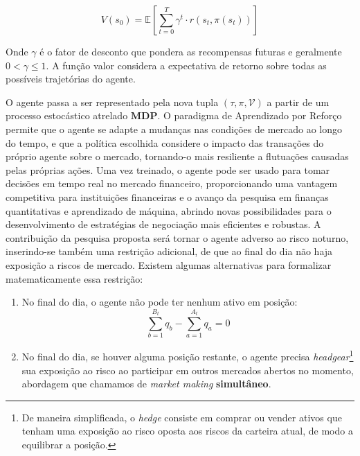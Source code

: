 \begin{itemize}
	\begin{equation*}
		V(s_0) = \mathbb{E}\left[\sum_{t=0}^{T} \gamma^t \cdot r(s_t, \pi(s_t)) \right]
		\end{equation*}
	
	Onde $\gamma$ é o fator de desconto que pondera as recompensas futuras e geralmente $0 < \gamma \leq 1$. A função valor considera a expectativa de retorno sobre todas as possíveis trajetórias do agente.
\end{itemize}

O agente passa a ser representado pela nova tupla $(\tau, \pi, \mathcal{V})$ a partir de um processo estocástico atrelado $\mathbf{MDP}$. O paradigma de Aprendizado por Reforço permite que o agente se adapte a mudanças nas condições de mercado ao longo do tempo, e que a política escolhida considere o impacto das transações do próprio agente sobre o mercado, tornando-o mais resiliente a flutuações causadas pelas próprias ações. Uma vez treinado, o agente pode ser usado para tomar decisões em tempo real no mercado financeiro, proporcionando uma vantagem competitiva para instituições financeiras e o avanço da pesquisa em finanças quantitativas e aprendizado de máquina, abrindo novas possibilidades para o desenvolvimento de estratégias de negociação mais eficientes e robustas. A contribuição da pesquisa proposta será tornar o agente adverso ao risco noturno, inserindo-se também uma restrição adicional, de que ao final do dia não haja exposição a riscos de mercado. 
Existem algumas alternativas para formalizar matematicamente essa restrição:
\begin{enumerate}
    \item No final do dia, o agente não pode ter nenhum ativo em posição: 
    \begin{equation} \label{overnight_restriction}
        \sum_{b=1}^{B_t} q_b  - \sum_{a=1}^{A_t} q_a = 0
    \end{equation}
    \item No final do dia, se houver alguma posição restante, o agente precisa \textit{headgear}\footnote{De maneira simplificada, o \textit{hedge} consiste em comprar ou vender ativos que tenham uma exposição ao risco oposta aos riscos da carteira atual, de modo a equilibrar a posição.} sua exposição ao risco ao participar em outros mercados abertos no momento, abordagem que chamamos de \textit{market making} \textbf{simultâneo}.
\end{enumerate}
